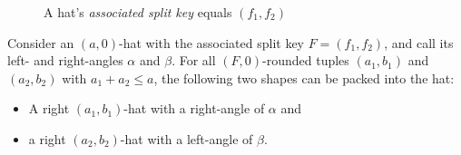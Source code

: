 \begin{figure}[htbp!]
    \centering


    \caption{A hat's \emph{associated split key} equals $(f_1, f_2)$}
    \label{fig:hatf}
\end{figure}


\begin{lemma}\label{th:hatsinhat}
    Consider an $(a,0)$-hat with the associated split key $F = (f_1, f_2)$, and call its left- and right-angles $\alpha$ and $\beta$.
    For all $(F,0)$-rounded tuples $(a_1, b_1)$ and $(a_2, b_2)$ with $a_1 + a_2 \le a$, the following two shapes can be packed into the hat:
    \begin{itemize}
        \item A right $(a_1,b_1)$-hat with a right-angle of $\alpha$ and
        \item a right $(a_2,b_2)$-hat with a left-angle of $\beta$.
    \end{itemize}
\end{lemma}

